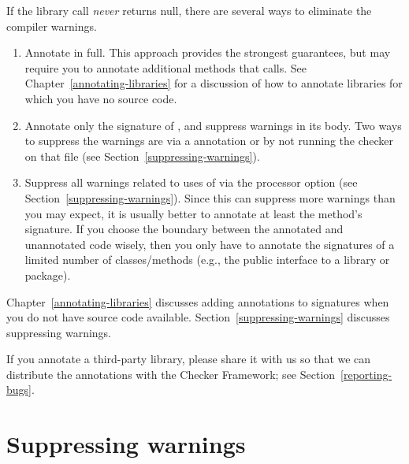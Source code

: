 If the library call \emph{never} returns null,
there are several ways to eliminate the compiler warnings.
\begin{enumerate}
\item Annotate  in full.  This approach provides
  the strongest guarantees, but may require you to annotate additional
  methods that  calls.  See
  Chapter~\ref{annotating-libraries} for a discussion of how to annotate
  libraries for which you have no source code.
\item Annotate only the signature of , and
  suppress warnings in its body.  Two ways to suppress the warnings are via a
   annotation or by not running the checker on that
  file (see Section~\ref{suppressing-warnings}).
\item Suppress all warnings related to uses of 
  via the  processor option
  (see Section~\ref{suppressing-warnings}).
  Since this can suppress more warnings than you may expect,
  it is usually better to annotate at least the method's signature.  If you
  choose the boundary between the annotated and unannotated code wisely,
  then you only have to annotate the signatures of a limited number of
  classes/methods
  (e.g., the public interface to a library or package).

\end{enumerate}

Chapter~\ref{annotating-libraries} discusses adding annotations to
signatures when you do not have source code available.
Section~\ref{suppressing-warnings} discusses suppressing warnings.


If you annotate a third-party library, please share it with us so that we
can distribute the annotations with the Checker Framework; see
Section~\ref{reporting-bugs}.


\section{Suppressing warnings\label{suppressing-warnings}}


